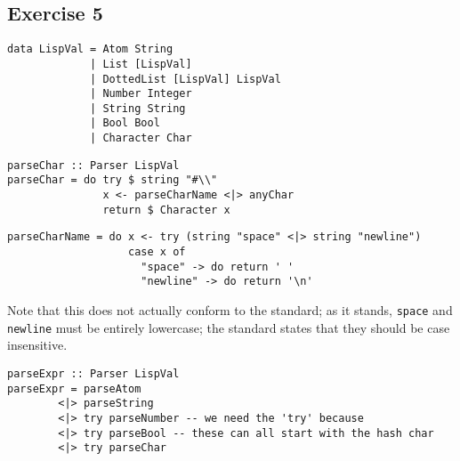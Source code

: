\subsection{Exercise 5}
 
\begin{lstlisting}
data LispVal = Atom String
             | List [LispVal]
             | DottedList [LispVal] LispVal
             | Number Integer
             | String String
             | Bool Bool
             | Character Char
\end{lstlisting}
 
\begin{lstlisting}
parseChar :: Parser LispVal
parseChar = do try $ string "#\\"
               x <- parseCharName <|> anyChar
               return $ Character x 
\end{lstlisting}
 
\begin{lstlisting}
parseCharName = do x <- try (string "space" <|> string "newline")
                   case x of 
                     "space" -> do return ' '
                     "newline" -> do return '\n'
\end{lstlisting}
 
Note that this does not actually conform to the standard; as it stands, \verb|space| and \verb|newline| must be entirely lowercase; the standard states that they should be case insensitive.
 
\begin{lstlisting}
parseExpr :: Parser LispVal
parseExpr = parseAtom
        <|> parseString
        <|> try parseNumber -- we need the 'try' because 
        <|> try parseBool -- these can all start with the hash char
        <|> try parseChar
\end{lstlisting}
